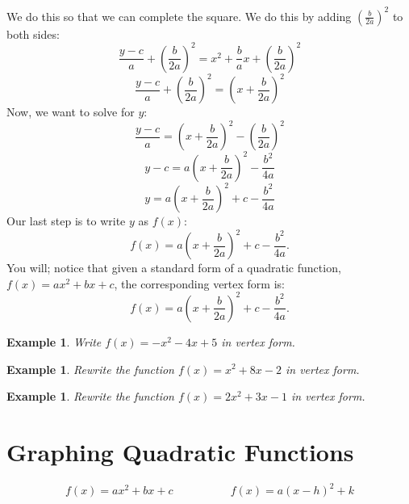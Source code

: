 \documentclass[twoside]{tufte-handout}
\newcommand{\booksection}{0}
\newcommand{\pageheader}{}
\newcounter{ekcounter}%
\theoremstyle{ekimcustom}
\newtheorem{exm}[ekcounter]{Example}
\begin{document}
  We do this so that we can complete the square. We do this by adding $\left(\frac{b}{2a}\right)^2$ to both sides: 
	 $$\frac{y-c}{a}+\left(\frac{b}{2a}\right)^2=x^2+\frac{b}{a}x+\left(\frac{b}{2a}\right)^2$$  
		$$\frac{y-c}{a}+\left(\frac{b}{2a}\right)^2=\left(x+\frac{b}{2a}\right)^2$$
 Now, we want to solve for $y$: $$\frac{y-c}{a}=\left(x+\frac{b}{2a}\right)^2-\left(\frac{b}{2a}\right)^2$$
	    $$y-c=a\left(x+\frac{b}{2a}\right)^2-\frac{b^2}{4a}$$
	  $$y=a\left(x+\frac{b}{2a}\right)^2+c-\frac{b^2}{4a}$$
 Our last step is to write $y$ as $f(x)$: $$f(x)=a\left(x+\frac{b}{2a}\right)^2+c-\frac{b^2}{4a}.$$
You will; notice that given a standard form of a quadratic function, $f(x)=ax^2+bx+c$, the corresponding vertex form is:  
$$f(x)=a\left(x+\frac{b}{2a}\right)^2+c-\frac{b^2}{4a}.$$









\everymath{\displaystyle}
\begin{exm}{}Write $f(x)=-x^2-4x+5$ in vertex form.
\end{exm}\vskip10pt

\begin{exm}{}Rewrite the function $f(x)=x^2+8x-2$ in vertex form.
\end{exm}\vskip10pt

\begin{exm}{}Rewrite the function $f(x)=2x^2+3x-1$ in vertex form.
\end{exm}\vskip10pt



\renewcommand{\booksection}{ Graphing Quadratic Functions  }    %
\renewcommand{\pageheader}{\booksection }
\resetcounters

\section*{\LARGE \pageheader}

$$f(x)=ax^2+bx+c~~~~~~~~~~~~~~~~~~~~~~~f(x)=a(x-h)^2+k$$


\end{document}
